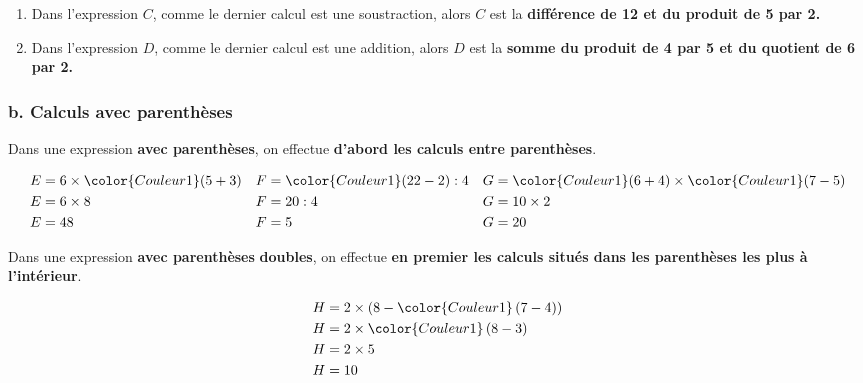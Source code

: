 \begin{Remarque}
\vspace{-0.5cm}
\begin{enumerate}
\item Dans l'expression $C$, comme le dernier calcul est une soustraction, alors $C$ est la \textbf{différence de 12 et du produit de 5 par 2.}
\item Dans l'expression $D$, comme le dernier calcul est une addition, alors $D$ est la \textbf{somme du produit de 4 par 5 et du quotient de 6 par 2.}
\end{enumerate}
\end{Remarque}


 
\subsubsection*{b. Calculs avec parenthèses}

\begin{Règle}
Dans une expression \textbf{avec parenthèses}, on
effectue \textbf{d'abord les calculs entre parenthèses}.
\end{Règle}

\begin{Exemples}
{\normalsize \begin{align*}
E & =6\times{\color{Couleur1}(5+3)} & F & ={\color{Couleur1}(22-2)}:4 & G & ={\color{Couleur1}(6+4)}\times{\color{Couleur1}(7-5)}\\
E & =6\times8 & F & =20:4 & G & =10\times2\\
E & =48 & F & =5 & G & =20
\end{align*}}
\end{Exemples}

\begin{Règle}
Dans une expression \textbf{avec parenthèses} \textbf{doubles},
on effectue \textbf{en premier les calculs situés dans les parenthèses les plus à l'intérieur}.
\end{Règle}

\begin{Exemple} 
{\normalsize
\begin{align*}
H & =2\times\left(8-{\color{Couleur1}\left(7-4\right)}\right)\\
H & =2\times{\color{Couleur1}\left(8-3\right)}\\
H & =2\times5\\
H & =10
\end{align*}}
\end{Exemple}


